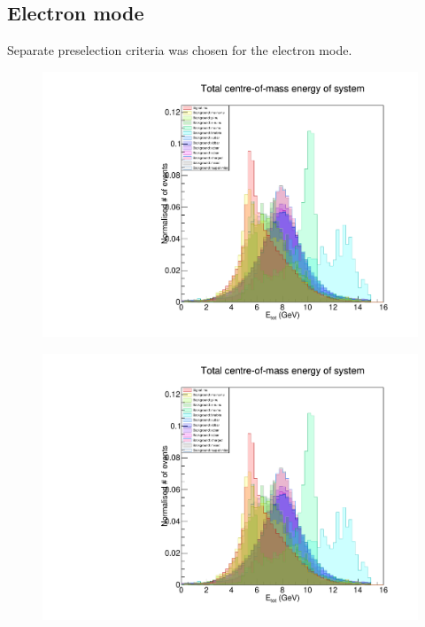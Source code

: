 \documentclass[12pt,a4paper]{article} %
\begin{document}
\subsection{Electron mode}




Separate preselection criteria was chosen for the electron mode. 


\begin{figure}[h]
\centering
\begin{minipage}{.5\textwidth}
  \centering
  \includegraphics[width=\linewidth]{images/stack/stack_cut6_totalCM_E.pdf}
  \label{fig:test1}
\end{minipage}%
\begin{minipage}{.5\textwidth}
  \centering
  \includegraphics[width=\linewidth]{images/stack/stack_cut6_totalCM_E.pdf}
  \label{fig:test2}
\end{minipage}
\end{figure}
\end{document}
